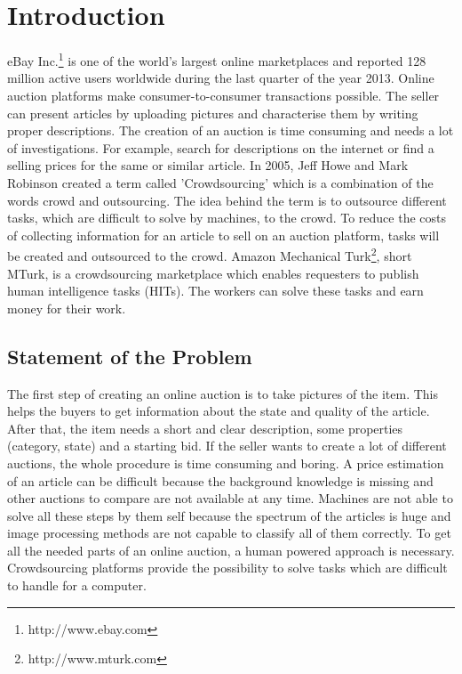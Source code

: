\documentclass[a4paper]{report}
\begin{document}
  




%

\pagestyle{plain}
\newpage





\dominitoc
\tableofcontents
\newpage

\listoffigures

\listoftables

\lstlistoflistings

\chapter{Introduction}
\newpage
eBay Inc.\footnote{http://www.ebay.com} is one of the world's largest online marketplaces and reported 128 million active users worldwide during the last quarter of the year 2013. Online auction platforms make consumer-to-consumer transactions possible. The seller can present articles by uploading pictures and characterise them by writing proper descriptions. The creation of an auction is time consuming and needs a lot of investigations. For example, search for descriptions on the internet or find a selling prices for the same or similar article. In 2005, Jeff Howe and Mark Robinson created a term called 'Crowdsourcing' which is a combination of the words crowd and outsourcing. The idea behind the term is to outsource different tasks, which are difficult to solve by machines, to the crowd. To reduce the costs of collecting information for an article to sell on an auction platform, tasks will be created and outsourced to the crowd. Amazon Mechanical Turk\footnote{http://www.mturk.com}, short MTurk, is a crowdsourcing marketplace which enables requesters to publish human intelligence tasks (HITs). The workers can solve these tasks and earn money for their work.

\section{Statement of the Problem}
The first step of creating an online auction is to take pictures of the item. This helps the buyers to get information about the state and quality of the article. After that, the item needs a short and clear description, some properties (category, state) and a starting bid. If the seller wants to create a lot of different auctions, the whole procedure is time consuming and boring. A price estimation of an article can be difficult because the background knowledge is missing and other auctions to compare are not available at any time. Machines are not able to solve all these steps by them self because the spectrum of the articles is huge and image processing methods are not capable to classify all of them correctly. To get all the needed parts of an online auction, a human powered approach is necessary. Crowdsourcing platforms provide the possibility to solve tasks which are difficult to handle for a computer.
\end{document}
